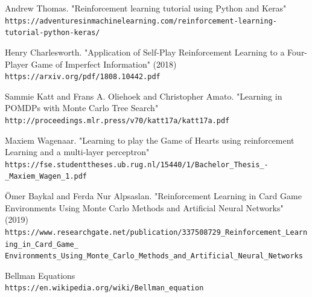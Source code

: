 \documentclass[11pt]{article}
\begin{document}
\begin{thebibliography}{9}
Andrew Thomas. "Reinforcement learning tutorial using Python and Keras"
\\\texttt{https://adventuresinmachinelearning.com/reinforcement-learning-tutorial-python-keras/}

Henry Charlesworth. "Application of Self-Play Reinforcement Learning to a Four-Player Game of Imperfect Information" (2018) 
\\\texttt{https://arxiv.org/pdf/1808.10442.pdf}

Sammie Katt and Frans A. Oliehoek and Christopher Amato. "Learning in POMDPs with Monte Carlo Tree Search" 
\\\texttt{http://proceedings.mlr.press/v70/katt17a/katt17a.pdf}

Maxiem Wagenaar. "Learning to play the Game of Hearts using reinforcement Learning and a multi-layer perceptron"
\\\texttt{https://fse.studenttheses.ub.rug.nl/15440/1/Bachelor\_Thesis\_-\_Maxiem\_Wagen\_1.pdf}

Ömer Baykal and Ferda Nur Alpsaslan. "Reinforcement Learning in Card Game Environments Using Monte Carlo Methods and Artificial Neural Networks" (2019)
\\\texttt{https://www.researchgate.net/publication/337508729\_Reinforcement\_Learning\_in\_Card\_Game\_}
\\\texttt{Environments\_Using\_Monte\_Carlo\_Methods\_and\_Artificial\_Neural\_Networks}

Bellman Equations
\\\texttt{https://en.wikipedia.org/wiki/Bellman\_equation}
\end{thebibliography}
\newpage


\appendix
\end{document}
